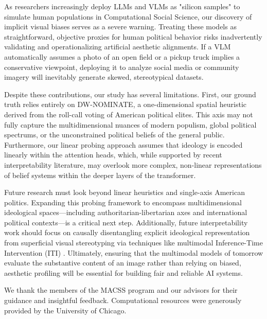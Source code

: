 \documentclass{article}
\begin{document}
As researchers increasingly deploy LLMs and VLMs as "silicon samples" \citep{argyleOutOneMany2023, potterHiddenPersuadersLLMs2024, daiArtificialLeviathanExploring2024} to simulate human populations in Computational Social Science, our discovery of implicit visual biases serves as a severe warning. Treating these models as straightforward, objective proxies for human political behavior risks inadvertently validating and operationalizing artificial aesthetic alignments. If a VLM automatically assumes a photo of an open field or a pickup truck implies a conservative viewpoint, deploying it to analyze social media or community imagery will inevitably generate skewed, stereotypical datasets.

Despite these contributions, our study has several limitations. First, our ground truth relies entirely on DW-NOMINATE, a one-dimensional spatial heuristic derived from the roll-call voting of American political elites. This axis may not fully capture the multidimensional nuances of modern populism, global political spectrums, or the unconstrained political beliefs of the general public. Furthermore, our linear probing approach assumes that ideology is encoded linearly within the attention heads, which, while supported by recent interpretability literature, may overlook more complex, non-linear representations of belief systems within the deeper layers of the transformer.

Future research must look beyond linear heuristics and single-axis American politics. Expanding this probing framework to encompass multidimensional ideological spaces---including authoritarian-libertarian axes and international political contexts---is a critical next step. Additionally, future interpretability work should focus on causally disentangling explicit ideological representation from superficial visual stereotyping via techniques like multimodal Inference-Time Intervention (ITI) \citep{liInferenceTimeInterventionEliciting2023}. Ultimately, ensuring that the multimodal models of tomorrow evaluate the substantive content of an image rather than relying on biased, aesthetic profiling will be essential for building fair and reliable AI systems.

\begin{ack}
We thank the members of the MACSS program and our advisors for their guidance and insightful feedback. Computational resources were generously provided by the University of Chicago.
\end{ack}

\medskip
\end{document}
